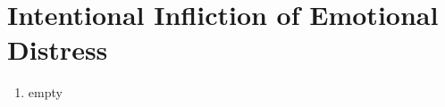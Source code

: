 \section{Intentional Infliction of Emotional Distress}

\begin{enumerate}
    \item empty
\end{enumerate}
